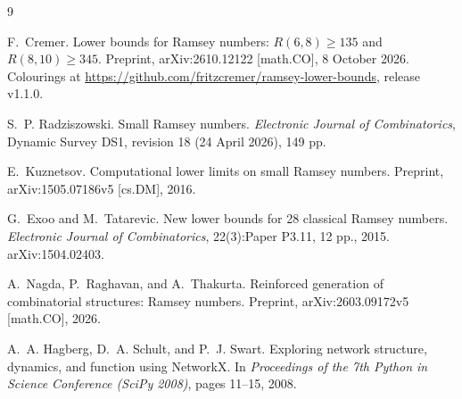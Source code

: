 \documentclass[11pt]{article}
\newcommand{\R}{R}
\begin{document}


\begin{thebibliography}{9}\small

F.~Cremer.
\newblock Lower bounds for Ramsey numbers: $\R(6,8)\ge 135$ and $\R(8,10)\ge 345$.
\newblock Preprint, arXiv:2610.12122 [math.CO], 8 October 2026.
\newblock Colourings at \url{https://github.com/fritzcremer/ramsey-lower-bounds}, release v1.1.0.

S.~P. Radziszowski.
\newblock Small Ramsey numbers.
\newblock \emph{Electronic Journal of Combinatorics}, Dynamic Survey DS1, revision 18
  (24 April 2026), 149 pp.

E.~Kuznetsov.
\newblock Computational lower limits on small Ramsey numbers.
\newblock Preprint, arXiv:1505.07186v5 [cs.DM], 2016.

G.~Exoo and M.~Tatarevic.
\newblock New lower bounds for 28 classical Ramsey numbers.
\newblock \emph{Electronic Journal of Combinatorics}, 22(3):Paper P3.11, 12 pp., 2015.
  arXiv:1504.02403.

A.~Nagda, P.~Raghavan, and A.~Thakurta.
\newblock Reinforced generation of combinatorial structures: Ramsey numbers.
\newblock Preprint, arXiv:2603.09172v5 [math.CO], 2026.

A.~A. Hagberg, D.~A. Schult, and P.~J. Swart.
\newblock Exploring network structure, dynamics, and function using NetworkX.
\newblock In \emph{Proceedings of the 7th Python in Science Conference (SciPy 2008)},
  pages 11--15, 2008.

\end{thebibliography}
\end{document}
